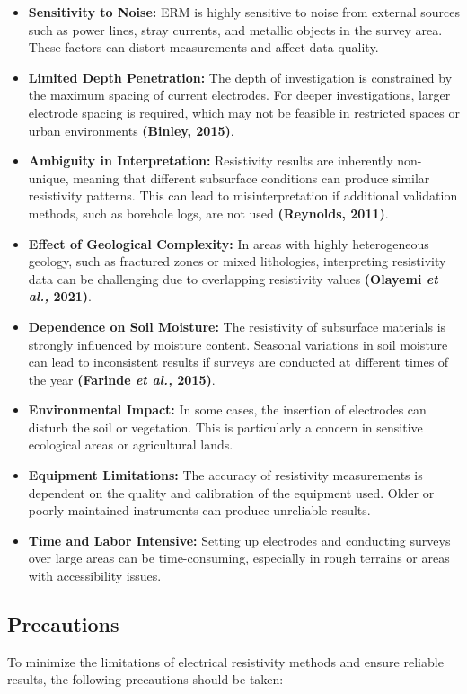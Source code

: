 \documentclass[12pt,a4paper]{report}
\begin{document}
\begin{itemize}
    \item \textbf{Sensitivity to Noise:} ERM is highly sensitive to noise from external sources such as power lines, stray currents, and metallic objects in the survey area. These factors can distort measurements and affect data quality.
    \item \textbf{Limited Depth Penetration:} The depth of investigation is constrained by the maximum spacing of current electrodes. For deeper investigations, larger electrode spacing is required, which may not be feasible in restricted spaces or urban environments \textbf{(Binley, 2015)}.
    \item \textbf{Ambiguity in Interpretation:} Resistivity results are inherently non-unique, meaning that different subsurface conditions can produce similar resistivity patterns. This can lead to misinterpretation if additional validation methods, such as borehole logs, are not used \textbf{(Reynolds, 2011)}.
    \item \textbf{Effect of Geological Complexity:} In areas with highly heterogeneous geology, such as fractured zones or mixed lithologies, interpreting resistivity data can be challenging due to overlapping resistivity values \textbf{(Olayemi \textit{et al.,} 2021)}.
    \item \textbf{Dependence on Soil Moisture:} The resistivity of subsurface materials is strongly influenced by moisture content. Seasonal variations in soil moisture can lead to inconsistent results if surveys are conducted at different times of the year \textbf{(Farinde \textit{et al.,} 2015)}.
    \item \textbf{Environmental Impact:} In some cases, the insertion of electrodes can disturb the soil or vegetation. This is particularly a concern in sensitive ecological areas or agricultural lands.
    \item \textbf{Equipment Limitations:} The accuracy of resistivity measurements is dependent on the quality and calibration of the equipment used. Older or poorly maintained instruments can produce unreliable results.
    \item \textbf{Time and Labor Intensive:} Setting up electrodes and conducting surveys over large areas can be time-consuming, especially in rough terrains or areas with accessibility issues.
\end{itemize}

\subsection{Precautions}
To minimize the limitations of electrical resistivity methods and ensure reliable results, the following precautions should be taken:
\end{document}
